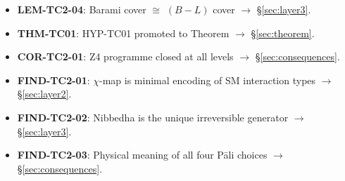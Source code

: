 \documentclass[12pt, a4paper]{article}
\begin{document}
\begin{formalbox}[title={Atomic units introduced by TASK-ZC12}]
\begin{itemize}[leftmargin=*]
    $\to$ \S\ref{sec:layer2}.
  \item \textbf{LEM-TC2-04}: Barami cover $\cong$ $(B-L)$ cover
    $\to$ \S\ref{sec:layer3}.
  \item \textbf{THM-TC01}: HYP-TC01 promoted to Theorem
    $\to$ \S\ref{sec:theorem}.
  \item \textbf{COR-TC2-01}: Z4 programme closed at all levels
    $\to$ \S\ref{sec:consequences}.
  \item \textbf{FIND-TC2-01}: $\chi$-map is minimal encoding of
    SM interaction types $\to$ \S\ref{sec:layer2}.
  \item \textbf{FIND-TC2-02}: Nibbedha is the unique irreversible
    generator $\to$ \S\ref{sec:layer3}.
  \item \textbf{FIND-TC2-03}: Physical meaning of all four Pāli
    choices $\to$ \S\ref{sec:consequences}.
\end{itemize}
\end{formalbox}
\end{document}
